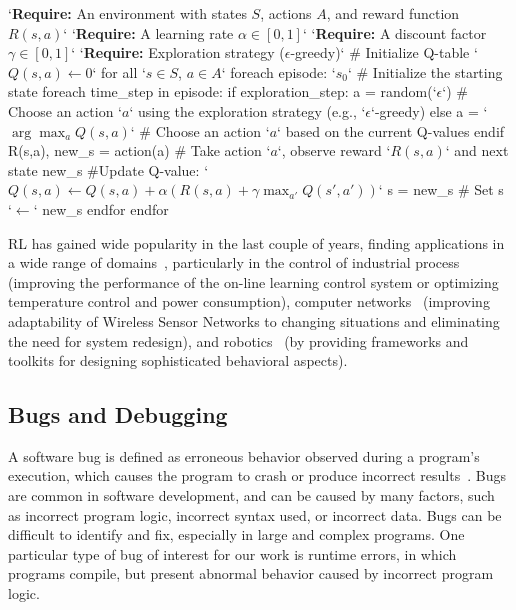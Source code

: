 \begin{python}[
  caption={Pseudo code for the Q-Learning algorithm.}, label={lst:qlearning}]
 `\textbf{Require:} An environment with states $S$, actions $A$, and reward function $R(s, a)$`
 `\textbf{Require:} A learning rate $\alpha \in [0, 1]$`
 `\textbf{Require:} A discount factor $\gamma \in [0, 1]$`
 `\textbf{Require:} Exploration strategy (\eg $\epsilon$-greedy)`
# Initialize Q-table `$Q(s, a) \gets 0$` for all `$s \in S$, $a \in A$`
foreach episode:
   `$s_0$` # Initialize the starting state 
   foreach time_step in episode:
      if exploration_step:
         a = random(`$\epsilon$`) # Choose an action `$a$` using the exploration strategy (e.g., `$\epsilon$`-greedy)
      else
         a = `$\arg\max_a Q(s, a)$`  # Choose an action `$a$` based on the current Q-values
      endif
        R(s,a), new_s = action(a) # Take action `$a$`, observe reward `$R(s,a)$` and next state new_s
        #Update Q-value: 
        `$Q(s, a) \gets Q(s, a) + \alpha \left( R(s,a) + \gamma \max_{a'} Q(s', a')\right)$`
        s = new_s # Set s `$\leftarrow$` new_s
    endfor
endfor
\end{python}

\ac{RL} has gained wide popularity in the last couple of years, finding applications in a wide range of 
domains~\cite{beakcheol19}, particularly in the control of industrial process~\cite{kiumarsi18} 
(improving the performance of the on-line learning control system or optimizing temperature control 
and power consumption), computer networks~\cite{alrawi13} (improving adaptability of Wireless 
Sensor Networks to changing situations and eliminating the need for system redesign), and 
robotics~\cite{zhang15} (by providing frameworks and toolkits for designing sophisticated behavioral 
aspects). 


\subsection{Bugs and Debugging}
\label{sec:deb}

A software bug is defined as erroneous behavior observed during a program's execution, which 
causes the program to crash or produce incorrect results~\cite{zeller09}. Bugs are common in 
software development, and can be caused by many factors, such as incorrect program logic, 
incorrect syntax used, or incorrect data. 
Bugs can be difficult to identify and fix, especially in large and complex programs. One particular 
type of bug of interest for our work is runtime errors, in which programs compile, but present  
abnormal behavior caused by incorrect program logic. 

